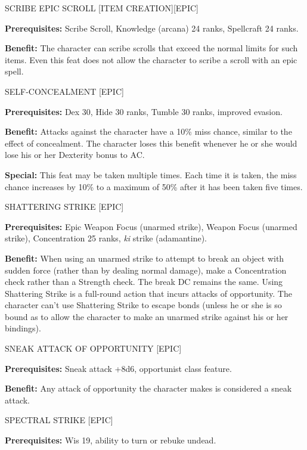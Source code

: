 \documentclass{article}
\begin{document}
\vspace{12pt}
SCRIBE EPIC SCROLL [ITEM CREATION][EPIC] 

\textbf{Prerequisites:} Scribe Scroll, Knowledge (arcana) 24 ranks, Spellcraft 
24 ranks. 

\textbf{Benefit:} The character can scribe scrolls that exceed the normal limits 
for such items. Even this feat does not allow the character to scribe a scroll 
with an epic spell.

\vspace{12pt}
SELF-CONCEALMENT [EPIC] 

\textbf{Prerequisites:} Dex 30, Hide 30 ranks, Tumble 30 ranks, improved evasion. 

\textbf{Benefit:} Attacks against the character have a 10\% miss chance, similar 
to the effect of concealment. The character loses this benefit whenever he or she 
would lose his or her Dexterity bonus to AC. 

\textbf{Special:} This feat may be taken multiple times. Each time it is taken, 
the miss chance increases by 10\% to a maximum of 50\% after it has been taken 
five times. 

\vspace{12pt}
SHATTERING STRIKE [EPIC] 

\textbf{Prerequisites:} Epic Weapon Focus (unarmed strike), Weapon Focus (unarmed 
strike), Concentration 25 ranks, \textit{ki }strike (adamantine). 

\textbf{Benefit:} When using an unarmed strike to attempt to break an object with 
sudden force (rather than by dealing normal damage), make a Concentration check 
rather than a Strength check. The break DC remains the same. Using Shattering Strike 
is a full-round action that incurs attacks of opportunity. The character can't 
use Shattering Strike to escape bonds (unless he or she is so bound as to allow 
the character to make an unarmed strike against his or her bindings). 

\vspace{12pt}
SNEAK ATTACK OF OPPORTUNITY [EPIC] 

\textbf{Prerequisites:} Sneak attack +8d6, opportunist class feature. 

\textbf{Benefit:} Any attack of opportunity the character makes is considered a 
sneak attack. 

\vspace{12pt}
SPECTRAL STRIKE [EPIC] 

\textbf{Prerequisites:} Wis 19, ability to turn or rebuke undead. 
\end{document}
